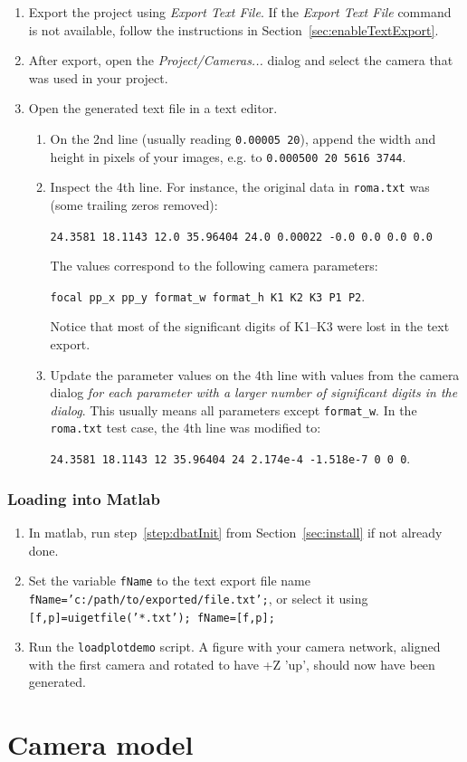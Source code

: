 \documentclass{article}
\begin{document}
\begin{enumerate}
\item Export the project using \emph{Export Text File}. If the
  \emph{Export Text File} command is not available, follow the
  instructions in Section~\ref{sec:enableTextExport}.
\item After export, open the \emph{Project/Cameras...} dialog and
  select the camera that was used in your project.
\item Open the generated text file in a text editor.
  \begin{enumerate}
  \item On the 2nd line (usually reading \texttt{0.00005 20}), append
    the width and height in pixels of your images, e.g. to
    \texttt{0.000500 20 5616 3744}.
  \item Inspect the 4th line. For instance,
    the original data in \texttt{roma.txt} was (some trailing zeros removed):

    \texttt{24.3581 18.1143 12.0 35.96404 24.0 0.00022 -0.0 0.0 0.0 0.0}

    The values correspond to the following camera parameters:

    \texttt{focal pp\_x pp\_y format\_w format\_h K1 K2 K3 P1 P2}.

    Notice that most of the significant digits of K1--K3 were lost in
    the text export.
  \item Update the parameter values on the 4th line with values from
    the camera dialog \emph{for each parameter with a larger number of
      significant digits in the dialog}. This usually means all
    parameters except \texttt{format\_w}. In the \texttt{roma.txt}
    test case, the 4th line was modified to:

    \texttt{24.3581 18.1143 12 35.96404 24 2.174e-4 -1.518e-7 0 0 0}.

  \end{enumerate}
\end{enumerate}

\subsubsection{Loading into Matlab}

\begin{enumerate}
\item In matlab, run step~\ref{step:dbatInit} from
  Section~\ref{sec:install} if not already done.
\item \sloppy Set the variable \texttt{fName} to the text export file name \texttt{fName='c:/path/to/exported/file.txt';}, or
  select it using \texttt{[f,p]=uigetfile('*.txt'); fName=[f,p];}
\item Run the \texttt{loadplotdemo} script. A figure with your camera
  network, aligned with the first camera and rotated to have +Z 'up',
  should now have been generated.
\end{enumerate}



\appendix

\section{Camera model}
\end{document}
